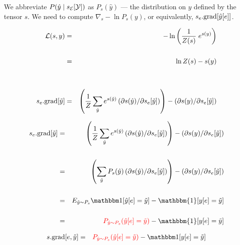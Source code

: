 {\vfill We abbreviate $P(\hat{y}\;|\;s_{\cal E}[{\cal Y}])$ as {\color{red} $P_s(\hat{y})$} --- the distribution on $\hat{y}$ defined by the tensor $s$.
\vfill
We need to compute {\color{red} $\nabla_s -\ln P_s(y)$}, or equivalently, {\color{red} $s_e.\mathrm{grad}[\hat{y}[e]]$}.


\begin{eqnarray*}
  {\cal L}(s,y) & = & - \ln \left(\frac{1}{Z(s)}\;e^{s(y)}\right) \\
  \\
  & = & \ln Z(s) - s(y) \\
  \\
  \\
  s_e.\mathrm{grad}[\tilde{y}]
    & = & \left(\frac{1}{Z} \sum_{\hat{y}} e^{s(\hat{y})} \left(\partial s(\hat{y})/\partial s_e[\tilde{y}]\right)\right)
    - \left(\partial s(y) /\partial s_e[\tilde{y}]\right)
\end{eqnarray*}


\bigskip
\begin{eqnarray*}
    s_e.\mathrm{grad}[\tilde{y}]
    & = & \left(\frac{1}{Z} \sum_{\hat{y}} e^{s(\hat{y})} \left(\partial s(\hat{y})/\partial s_e[\tilde{y}]\right)\right)
    - \left(\partial s(y) /\partial s_e[\tilde{y}]\right)    \\
    \\
    & = & \left(\sum_{\hat{y}} P_s(\hat{y}) \left(\partial s(\hat{y})/\partial s_e[\tilde{y}]\right)\right)
    - \left(\partial s(y) /\partial s_e[\tilde{y}]\right)    \\
    \\
    & = & E_{\hat{y} \sim P_s}\bbone[\hat{y}[e] = \tilde{y}]
    - \mathbbm{1}[y[e] = \tilde{y}] \\
    \\
    & = & {\color{red} P_{\hat{y} \sim P_s}(\hat{y}[e] = \tilde{y})}
      - \mathbbm{1}[y[e] = \tilde{y}]
\end{eqnarray*}


\begin{eqnarray*}
    s.\mathrm{grad}[e,\tilde{y}]
    & = &  {\color{red} P_{\hat{y} \sim P_s}(\hat{y}[e] = \tilde{y})} - \bbone[y[e] = \tilde{y}] \\
\end{eqnarray*}

}
